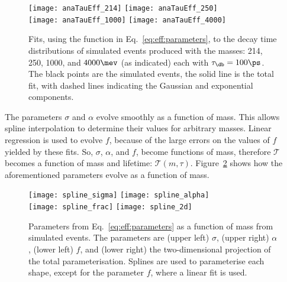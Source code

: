\begin{figure}
  \begin{center}
    \texttt{[image: anaTauEff\_214]}
    \texttt{[image: anaTauEff\_250]}\\
    \texttt{[image: anaTauEff\_1000]}
    \texttt{[image: anaTauEff\_4000]}
    \caption[Decay time distributions for various dark boson masses]
    {
      Fits, using the function in Eq.~\protect\ref{eq:eff:parameters},
      to the decay time distributions of simulated events produced with the masses:
      214, 250, 1000, and $4000\mev$ (as indicated)
      each with $\tau_\db=100\ps$.
      The black points are the simulated events, the solid line is the total fit, with dashed lines
      indicating the Gaussian and exponential components.
    }
    \label{fig:eff:fits}
  \end{center}
\end{figure}

The parameters $\sigma$ and $\alpha$ evolve smoothly as a function of mass.
This allows spline interpolation to determine their values for arbitrary masses.
Linear regression is used to evolve $f$, because of the large errors on the values of $f$ yielded
by these fits.
So, $\sigma$, $\alpha$, and $f$, become functions of mass, therefore $\mathcal{T}$ becomes a
function of mass and lifetime: $\mathcal{T}(m,\tau)$.
Figure~\ref{fig:eff:spline} shows how the aforementioned parameters evolve as a function of mass.

\begin{figure}
  \begin{center}
    \texttt{[image: spline\_sigma]}
    \texttt{[image: spline\_alpha]}\\
    \texttt{[image: spline\_frac]}
    \texttt{[image: spline\_2d]}
    \caption[Parameterisation of decay time acceptance as a function of mass]
    {
      Parameters from Eq.~\protect\ref{eq:eff:parameters} as a function of mass from
      simulated events.
      The parameters are
      (upper left) $\sigma$,
      (upper right) $\alpha$,
      (lower left) $f$, and
      (lower right) the two-dimensional projection of the total parameterisation.
      Splines are used to parameterise each shape, except for the parameter $f$, where a
      linear fit is used.
    }
    \label{fig:eff:spline}
  \end{center}
\end{figure}


